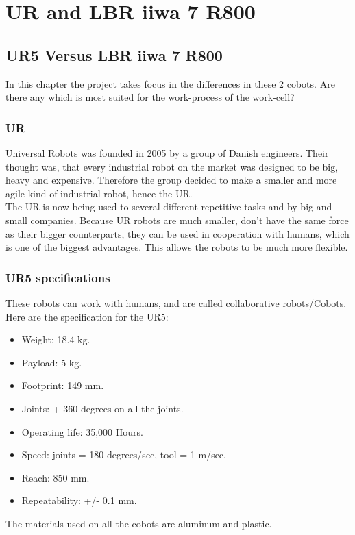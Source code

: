 \chapter{UR and LBR iiwa 7 R800} \label{ch:UR}

\section{UR5 Versus LBR iiwa 7 R800}

In this chapter the project takes focus in the differences in these 2 cobots. Are there any which is most suited for the work-process of the work-cell?

\subsection{UR}

Universal Robots was founded in 2005 by a group of Danish engineers. Their thought was, that every industrial robot on the market was designed to be big, heavy and expensive. Therefore the group decided to make a smaller and more agile kind of industrial robot, hence the UR.\cite{Urhist}\\


The UR is now being used to several different repetitive tasks and by big and small companies.
Because UR robots are much smaller, don't have the same force as their bigger counterparts, they can be used in cooperation with humans, which is one of the biggest advantages. This allows the robots to be much more flexible. 


\subsection{UR5 specifications}

These robots can work with humans, and are called collaborative robots/Cobots.\\
Here are the specification for the UR5:\\ 
\begin{itemize}
    \item Weight: 18.4 kg.
    \item Payload: 5 kg.
    \item Footprint: 149 mm.
    \item Joints: +-360 degrees on all the joints.
    \item Operating life: 35,000 Hours.
    \item Speed: joints = 180 degrees/sec, tool = 1 m/sec.
    \item Reach: 850 mm.
    \item Repeatability: +/- 0.1 mm.
\end{itemize}
The materials used on all the cobots are aluminum and plastic\cite{Ur5_about}\cite{UR5_tech}.



